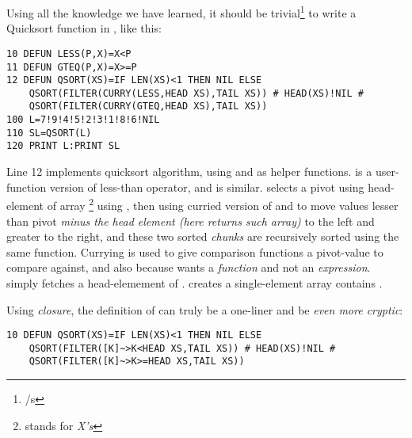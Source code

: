 Using all the knowledge we have learned, it should be trivial\footnote{/s} to write a Quicksort function in \tbas, like this:

\begin{lstlisting}
10 DEFUN LESS(P,X)=X<P
11 DEFUN GTEQ(P,X)=X>=P
12 DEFUN QSORT(XS)=IF LEN(XS)<1 THEN NIL ELSE
    QSORT(FILTER(CURRY(LESS,HEAD XS),TAIL XS)) # HEAD(XS)!NIL # 
    QSORT(FILTER(CURRY(GTEQ,HEAD XS),TAIL XS))
100 L=7!9!4!5!2!3!1!8!6!NIL
110 SL=QSORT(L)
120 PRINT L:PRINT SL
\end{lstlisting}

Line 12 implements quicksort algorithm, using  and  as helper functions.  is a user-function version of less-than operator, and  is similar.  selects a pivot using head-element of array \footnote{stands for \emph{X's}} using , then using curried version of  and  to move values lesser than pivot \emph{minus the head element (here  returns such array)} to the left and greater to the right, and these two sorted \emph{chunks} are recursively sorted using the same  function. Currying is used to give comparison functions a pivot-value to compare against, and also because  wants a \emph{function} and not an \emph{expression}.  simply fetches a head-elemement of .  creates a single-element array contains .

Using \emph{closure}, the definition of  can truly be a one-liner and be \emph{even more cryptic}:

\begin{lstlisting}
10 DEFUN QSORT(XS)=IF LEN(XS)<1 THEN NIL ELSE
    QSORT(FILTER([K]~>K<HEAD XS,TAIL XS)) # HEAD(XS)!NIL # 
    QSORT(FILTER([K]~>K>=HEAD XS,TAIL XS))
\end{lstlisting}
